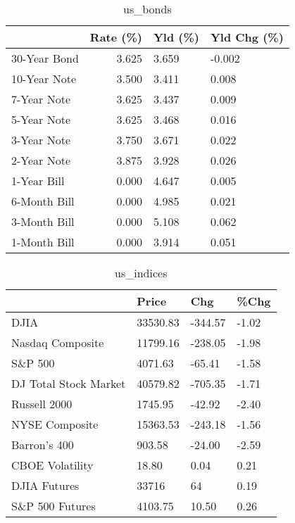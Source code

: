 \documentclass{article}%
\begin{document}
%


\begin{table}[htbp]%
\caption{us\_bonds}%
\centering%
\begin{adjustbox}{width=1\textwidth}%
\begin{tabular}{lrll}
\toprule
             &  Rate (\%) & Yld (\%) & Yld Chg (\%) \\
\midrule
30-Year Bond &     3.625 &   3.659 &      -0.002 \\
10-Year Note &     3.500 &   3.411 &       0.008 \\
 7-Year Note &     3.625 &   3.437 &       0.009 \\
 5-Year Note &     3.625 &   3.468 &       0.016 \\
 3-Year Note &     3.750 &   3.671 &       0.022 \\
 2-Year Note &     3.875 &   3.928 &       0.026 \\
 1-Year Bill &     0.000 &   4.647 &       0.005 \\
6-Month Bill &     0.000 &   4.985 &       0.021 \\
3-Month Bill &     0.000 &   5.108 &       0.062 \\
1-Month Bill &     0.000 &   3.914 &       0.051 \\
\bottomrule
\end{tabular}
%
\end{adjustbox}%
\end{table}

%


\begin{table}[htbp]%
\caption{us\_indices}%
\centering%
\begin{adjustbox}{width=1\textwidth}%
\begin{tabular}{llll}
\toprule
                      &    Price &     Chg &  \%Chg \\
\midrule
                 DJIA & 33530.83 & -344.57 & -1.02 \\
     Nasdaq Composite & 11799.16 & -238.05 & -1.98 \\
              S\&P 500 &  4071.63 &  -65.41 & -1.58 \\
DJ Total Stock Market & 40579.82 & -705.35 & -1.71 \\
         Russell 2000 &  1745.95 &  -42.92 & -2.40 \\
       NYSE Composite & 15363.53 & -243.18 & -1.56 \\
         Barron's 400 &   903.58 &  -24.00 & -2.59 \\
      CBOE Volatility &    18.80 &    0.04 &  0.21 \\
         DJIA Futures &    33716 &      64 &  0.19 \\
      S\&P 500 Futures &  4103.75 &   10.50 &  0.26 \\
\bottomrule
\end{tabular}
%
\end{adjustbox}%
\end{table}
\end{document}
